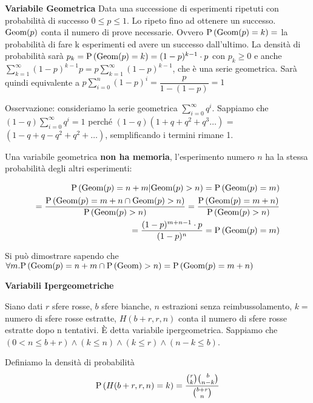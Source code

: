 \begin{defn}
    \textbf{Variabile Geometrica}
    Data una successione di esperimenti ripetuti con probabilità di successo $ 0 \leq p \leq 1 $. Lo ripeto fino ad ottenere un successo. $ \text{Geom}(p) $ conta il numero di prove necessarie. Ovvero $ \text{P}\left(\text{Geom}(p) = k\right) = $ la probabilità di fare k esperimenti ed avere un successo dall'ultimo. La densità di probabilità sarà $ p_k = \text{P}\left(\text{Geom}(p) = k\right) = (1-p)^{k-1} \cdot p $ con $ p_k \geq 0 $ e anche $ \sum_{k=1}^{\infty} (1-p)^{k-1} p = p \sum_{k=1}^{\infty}(1-p)^{k-1} $, che è una serie geometrica. Sarà quindi equivalente a $ p \sum_{i=0}^{n} (1-p)^i = \dfrac{p}{1-(1-p)} = 1$
    
    
    Osservazione: consideriamo la serie geometrica $ \sum_{i=0}^{\infty} q^i $.
    Sappiamo che $ (1-q) \sum_{i=0}^{\infty} q^i = 1 $ perché $ (1-q)(1+q+q^2+q^3\dots) $ = $( 1 - q + q - q^2 + q^2 + \dots )$, semplificando i termini rimane 1.
    
    Una variabile geometrica \textbf{non ha memoria}, l'esperimento numero $ n $ ha la stessa probabilità degli altri esperimenti:
    
    \begin{equation*}
    \begin{aligned}
    \text{P}\left(\text{Geom}(p) = n+m | \text{Geom}(p) > n\right) = \text{P}\left(\text{Geom}(p) = m\right) \\
    = \dfrac{\text{P}\left(\text{Geom}(p) = m + n \cap \text{Geom}(p) > n\right)}{\text{P}\left(\text{Geom}(p) > n\right)} = \dfrac{\text{P}\left(\text{Geom}(p) = m+n\right)}{\text{P}\left(\text{Geom}(p) > n\right)}\\ 
    = \dfrac{(1-p)^{m+n-1} \cdot p}{(1-p)^n} = \text{P}\left(\text{Geom}(p) = m\right) \\
    \end{aligned}
    \end{equation*}
    
    Si può dimostrare sapendo che $ \forall m . \text{P}\left(\text{Geom}(p) = n+m \cap \text{P}\left(\text{Geom}\right) > n\right) = \text{P}\left(\text{Geom}(p) = m+n\right) $
    
\end{defn}

\begin{defn}
    \textbf{Variabili Ipergeometriche}
    
    Siano dati $ r $ sfere rosse, $ b $ sfere bianche, $ n $ estrazioni senza reimbussolamento, $ k = $ numero di sfere rosse estratte, $ H(b+r, r, n) $ conta il numero di sfere rosse estratte dopo n tentativi. È detta variabile ipergeometrica. Sappiamo che $ (0 < n \leq b + r) \land (k \leq n)  \land (k \leq r) \land (n-k \leq b) $.
    
    Definiamo la densità di probabilità
    \begin{equation*}
    \text{P}\left(H(b+r, r, n) = k\right) = \dfrac{\binom{r}{k} \binom{b}{n-k}}{\binom{b+r}{n}}
    \end{equation*}
\end{defn}


